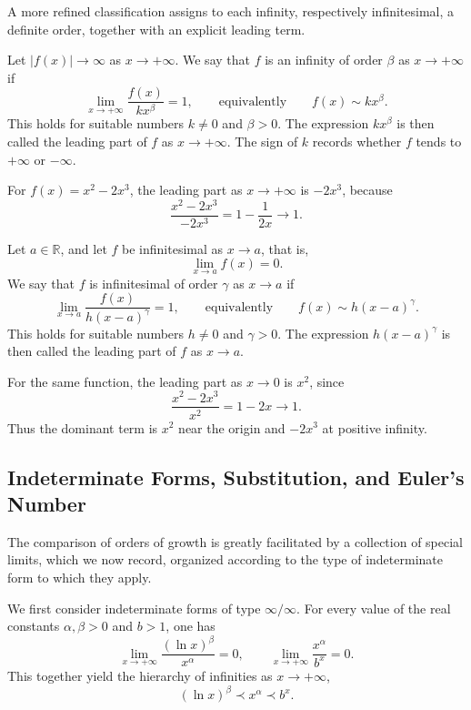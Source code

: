 A more refined classification assigns to each infinity, respectively infinitesimal, a definite order, together with an explicit leading term.

\begin{definition}
Let $|f(x)|\to\infty$ as $x\to+\infty$. We say that $f$ is an infinity of order $\beta$ as $x \to +\infty$ if
\[
\lim_{x \to +\infty} \frac{f(x)}{k x^\beta} = 1, \qquad \text{equivalently} \qquad f(x) \sim k x^\beta.
\]
This holds for suitable numbers $k\neq0$ and $\beta>0$. The expression $kx^\beta$
is then called the leading part of $f$ as $x\to+\infty$. The sign of
$k$ records whether $f$ tends to $+\infty$ or $-\infty$.
\end{definition}

For $f(x)=x^2-2x^3$, the leading part as $x\to+\infty$ is
$-2x^3$, because
\[
\frac{x^2-2x^3}{-2x^3}=1-\frac{1}{2x}\longrightarrow1.
\]

\begin{definition}
Let $a \in \mathbb{R}$, and let $f$ be infinitesimal as $x \to a$, that is,
\[
\lim_{x \to a} f(x) = 0.
\]
We say that $f$ is infinitesimal of order $\gamma$ as $x \to a$ if
\[
\lim_{x \to a} \frac{f(x)}{h (x-a)^\gamma} = 1, \qquad \text{equivalently} \qquad f(x) \sim h (x-a)^\gamma.
\]
This holds for suitable numbers $h \neq 0$ and $\gamma > 0$. The expression $h(x-a)^\gamma$ is then called the leading part of $f$ as $x \to a$.
\end{definition}

For the same function, the leading part as $x\to0$ is $x^2$, since
\[
\frac{x^2-2x^3}{x^2}=1-2x\longrightarrow1.
\]
Thus the dominant term is $x^2$ near the origin and $-2x^3$ at
positive infinity.

\subsection{Indeterminate Forms, Substitution, and Euler's Number}

The comparison of orders of growth is greatly facilitated by a collection of special limits, which we now record, organized according to the type of indeterminate form to which they apply.

We first consider indeterminate forms of type $\infty/\infty$. For every value of the real constants $\alpha, \beta > 0$ and $b > 1$, one has
\[
\lim_{x \to +\infty} \frac{(\ln x)^\beta}{x^\alpha} = 0, \qquad \lim_{x \to +\infty} \frac{x^\alpha}{b^x} = 0.
\]
This together yield the hierarchy of infinities as $x \to +\infty$,
\[
(\ln x)^\beta \prec x^\alpha \prec b^x.
\]

